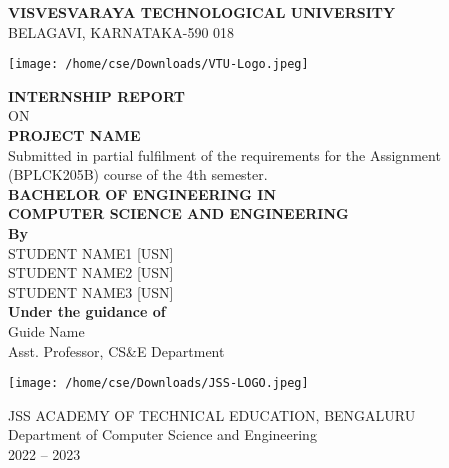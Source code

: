 \documentclass[12pt]{article}
\begin{document}
	\begin{center}
		\vspace*{-0.5cm}
		\huge
		\textbf{VISVESVARAYA TECHNOLOGICAL UNIVERSITY}\\
		\vspace{0.5cm}
		\large
		BELAGAVI, KARNATAKA-590 018\\
		\vspace{0.5cm}
		
		\begin{center}
			\texttt{[image: /home/cse/Downloads/VTU-Logo.jpeg]}
		\end{center}
		
		\vspace{0.5cm}
		\large
		\textbf{INTERNSHIP REPORT}\\
		\vspace{0cm}
		\large
		ON\\
		\vspace{0cm}
		\textbf{PROJECT NAME}\\
		\vspace{0.1cm}
		\large
		Submitted in partial fulfilment of the requirements for the Assignment
		(BPLCK205B) course of the 4th semester.\\
		\vspace{1cm}
\large
\textbf{BACHELOR OF ENGINEERING IN}\\
\textbf{COMPUTER SCIENCE AND ENGINEERING}\\
\vspace{0cm}
\large
\textbf{By}\\
\vspace{0.5cm}
\normalsize
STUDENT NAME1 [USN]\\
STUDENT NAME2 [USN]\\
STUDENT NAME3 [USN]\\
\vspace{0cm}
\large
\textbf{Under the guidance of}\\
\vspace{0.5cm}
\normalsize
Guide Name\\
Asst. Professor, CS\&E Department\\
\vspace{1cm}
\begin{center}
	\texttt{[image: /home/cse/Downloads/JSS-LOGO.jpeg]}
\end{center}

\vspace{0.5cm}
\large
JSS ACADEMY OF TECHNICAL EDUCATION, BENGALURU\\
Department of Computer Science and Engineering\\
2022 – 2023\\
\end{center}
\end{document}
